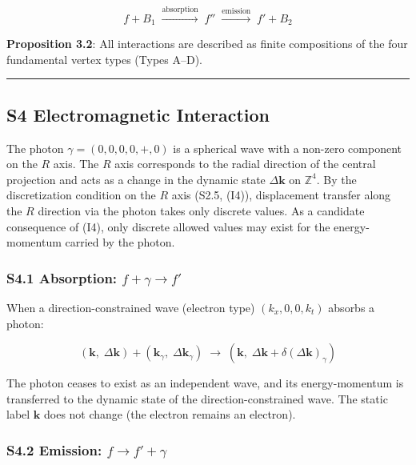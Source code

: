 \documentclass[
  a4paper,11pt]{article}
\theoremstyle{definition}
\theoremstyle{remark}
\begin{document}
\[f + B_1 \;\xrightarrow{\text{absorption}}\; f'' \;\xrightarrow{\text{emission}}\; f' + B_2\]

\textbf{Proposition 3.2}: All interactions are described as finite
compositions of the four fundamental vertex types (Types A--D).

\begin{center}\rule{0.5\linewidth}{0.5pt}\end{center}

\subsection{S4 Electromagnetic
Interaction}\label{s4-electromagnetic-interaction}

The photon \(\gamma = (0, 0, 0, 0, +, 0)\) is a spherical wave with a
non-zero component on the \(R\) axis. The \(R\) axis corresponds to the
radial direction of the central projection and acts as a change in the
dynamic state \(\Delta\mathbf{k}\) on \(\mathbb{Z}^4\). By the
discretization condition on the \(R\) axis (S2.5, (I4)), displacement
transfer along the \(R\) direction via the photon takes only discrete
values. As a candidate consequence of (I4), only discrete allowed values
may exist for the energy-momentum carried by the photon.

\subsubsection{\texorpdfstring{S4.1 Absorption:
\(f + \gamma \to f'\)}{S4.1 Absorption: f + \textbackslash gamma \textbackslash to f\textquotesingle{}}}\label{s4.1-absorption-f-gamma-to-f}

When a direction-constrained wave (electron type) \((k_x, 0, 0, k_t)\)
absorbs a photon:

\[(\mathbf{k},\; \Delta\mathbf{k}) + (\mathbf{k}_\gamma,\; \Delta\mathbf{k}_\gamma) \;\longrightarrow\; (\mathbf{k},\; \Delta\mathbf{k} + \delta(\Delta\mathbf{k})_\gamma)\]

The photon ceases to exist as an independent wave, and its
energy-momentum is transferred to the dynamic state of the
direction-constrained wave. The static label \(\mathbf{k}\) does not
change (the electron remains an electron).

\subsubsection{\texorpdfstring{S4.2 Emission:
\(f \to f' + \gamma\)}{S4.2 Emission: f \textbackslash to f\textquotesingle{} + \textbackslash gamma}}\label{s4.2-emission-f-to-f-gamma}
\end{document}
